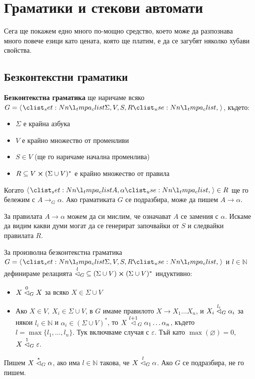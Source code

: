 \chapter{Граматики и стекови автомати}

Сега ще покажем едно много по-мощно средство,
което може да разпознава много повече езици като цената, която ще платим,
е да се загубят няколко хубави свойства.

\section{Безконтекстни граматики}

\begin{definition}
    \textbf{Безконтекстна граматика} ще наричаме всяко $G = \opair{\Sigma, V, S, R}$, където:
    \begin{itemize}
        \item $\Sigma$ е крайна азбука
        \item $V$ е крайно множество от променливи
        \item $S \in V$ (ще го наричаме начална променлива)
        \item $R \subseteq V \cross (\Sigma \cup V)^*$ е крайно множество от правила
    \end{itemize}
\end{definition}

\begin{remark}
    Когато $\opair{A, \alpha} \in R$ ще го бележим с $A \rightarrow_G \alpha$.
    Ако граматиката $G$ се подразбира, може да пишем $A \rightarrow \alpha$.
\end{remark}

За правилата $A \rightarrow \alpha$ можем да си мислим, че означават $A$ се замения с $\alpha$.
Искаме да видим какви думи могат да се генерират започвайки от $S$ и следвайки правилата $R$.

\begin{definition}
    За произволна безконтекстна граматика $G = \opair{\Sigma, V, S, R}$ и $l \in \mathbb{N}$ дефинираме релацията $\stackrel{l}{\vartriangleleft}_G \: \subseteq (\Sigma \cup V) \cross (\Sigma \cup V)^*$ индуктивно:
    \begin{itemize}
        \item $X \stackrel{0}{\vartriangleleft}_G X$ за всяко $X \in \Sigma \cup V$
        \item Ако $X \in V, \: X_i \in \Sigma \cup V$, в $G$ имаме правилото $X \rightarrow X_1 \dots X_n$, и $X_i \stackrel{l_i}{\vartriangleleft}_G \alpha_i$ за някои $l_i \in \mathbb{N}$ и $\alpha_i \in (\Sigma \cup V)^*$,
              то $X \stackrel{l + 1}{\vartriangleleft}_G \alpha_1 \dots \alpha_n$, където $l = \max \{ l_1, \dots, l_n \}$. Тук включваме случая с $\varepsilon$.
              Тъй като $\max(\varnothing) = 0$, $X \stackrel{1}{\vartriangleleft}_G \varepsilon$.
    \end{itemize}
    Пишем $X \stackrel{*}{\vartriangleleft}_G \alpha$, ако има $l \in \mathbb{N}$ такова, че $X \stackrel{l}{\vartriangleleft}_G \alpha$.
    Ако $G$ се подразбира, не го пишем.
\end{definition}

